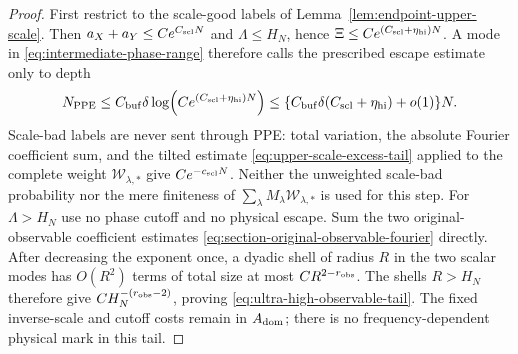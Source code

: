 \documentclass[11pt]{article}
\begin{document}
\begin{proof}
First restrict to the scale-good labels of
Lemma~\ref{lem:endpoint-upper-scale}.  Then
$a_X+a_Y\le Ce^{C_{\rm scl}N}$ and $\Lambda\le H_N$, hence
$\Xi\le Ce^{(C_{\rm scl}+\eta_{\rm hi})N}$.  A mode in
\eqref{eq:intermediate-phase-range} therefore calls the prescribed escape
estimate only to depth
\begin{equation}
\label{eq:intermediate-max-resolving-depth}
 N_{\rm PPE}\le C_{\rm buf}\delta
       \log\!\left(Ce^{(C_{\rm scl}+\eta_{\rm hi})N}\right)
 \le \{C_{\rm buf}\delta(C_{\rm scl}+\eta_{\rm hi})+o(1)\}N.
\end{equation}
Scale-bad labels are never sent through PPE: total variation, the absolute
Fourier coefficient sum, and the tilted estimate
\eqref{eq:upper-scale-excess-tail} applied to the complete weight
$\mathscr W_{\lambda,*}$ give $Ce^{-c_{\rm scl}N}$.  Neither the unweighted
scale-bad probability nor the mere finiteness of
$\sum_\lambda M_\lambda\mathscr W_{\lambda,*}$ is used for this step.
For $\Lambda>H_N$ use no phase cutoff and no physical escape.  Sum the two
original-observable coefficient estimates
\eqref{eq:section-original-observable-fourier} directly.  After decreasing
the exponent once, a dyadic shell of radius $R$ in the two scalar modes has
$O(R^2)$ terms of total size at most $CR^{2-r_{\rm obs}}$.  The shells
$R>H_N$ therefore give $CH_N^{-(r_{\rm obs}-2)}$, proving
\eqref{eq:ultra-high-observable-tail}.  The fixed inverse-scale and cutoff
costs remain in $A_{\rm dom}$; there is no frequency-dependent physical mark
in this tail.


\end{proof}
\end{document}
